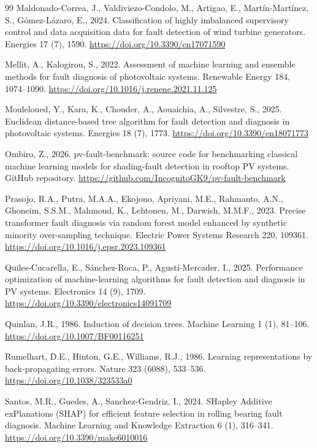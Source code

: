 \documentclass[11pt,a4paper]{article}
\begin{document}
\begin{thebibliography}{99}
Maldonado-Correa, J., Valdiviezo-Condolo, M., Artigao, E., Mart\'in-Mart\'inez, S., G\'omez-L\'azaro, E., 2024. Classification of highly imbalanced supervisory control and data acquisition data for fault detection of wind turbine generators. Energies 17 (7), 1590. \url{https://doi.org/10.3390/en17071590}

Mellit, A., Kalogirou, S., 2022. Assessment of machine learning and ensemble methods for fault diagnosis of photovoltaic systems. Renewable Energy 184, 1074--1090. \url{https://doi.org/10.1016/j.renene.2021.11.125}

Mouleloued, Y., Kara, K., Chouder, A., Aouaichia, A., Silvestre, S., 2025. Euclidean distance-based tree algorithm for fault detection and diagnosis in photovoltaic systems. Energies 18 (7), 1773. \url{https://doi.org/10.3390/en18071773}

Ombiro, Z., 2026. pv-fault-benchmark: source code for benchmarking classical machine learning models for shading-fault detection in rooftop PV systems. GitHub repository. \url{https://github.com/IncognitoGK9/pv-fault-benchmark}

Prasojo, R.A., Putra, M.A.A., Ekojono, Apriyani, M.E., Rahmanto, A.N., Ghoneim, S.S.M., Mahmoud, K., Lehtonen, M., Darwish, M.M.F., 2023. Precise transformer fault diagnosis via random forest model enhanced by synthetic minority over-sampling technique. Electric Power Systems Research 220, 109361. \url{https://doi.org/10.1016/j.epsr.2023.109361}

Quiles-Cucarella, E., S\'anchez-Roca, P., Agust\'i-Mercader, I., 2025. Performance optimization of machine-learning algorithms for fault detection and diagnosis in PV systems. Electronics 14 (9), 1709. \url{https://doi.org/10.3390/electronics14091709}

Quinlan, J.R., 1986. Induction of decision trees. Machine Learning 1 (1), 81--106. \url{https://doi.org/10.1007/BF00116251}

Rumelhart, D.E., Hinton, G.E., Williams, R.J., 1986. Learning representations by back-propagating errors. Nature 323 (6088), 533--536. \url{https://doi.org/10.1038/323533a0}

Santos, M.R., Guedes, A., Sanchez-Gendriz, I., 2024. SHapley Additive exPlanations (SHAP) for efficient feature selection in rolling bearing fault diagnosis. Machine Learning and Knowledge Extraction 6 (1), 316--341. \url{https://doi.org/10.3390/make6010016}


\end{thebibliography}
\end{document}
